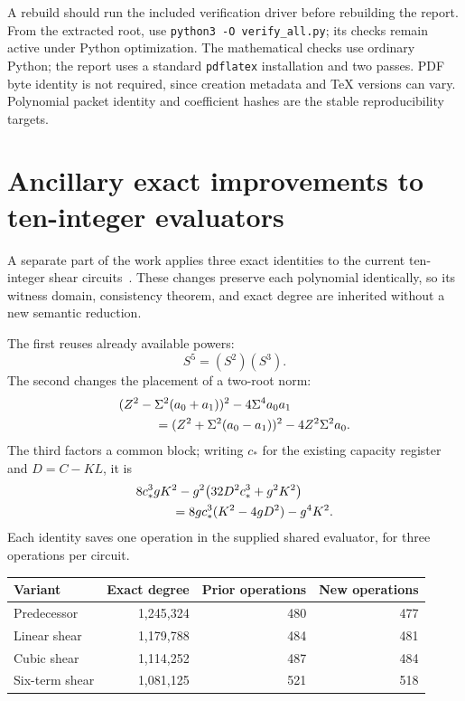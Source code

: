 \documentclass[11pt]{article}
\theoremstyle{definition}
\theoremstyle{remark}
\begin{document}
A rebuild should run the included verification driver before rebuilding
the report. From the extracted root, use
\texttt{python3 -O verify\_all.py}; its checks remain active under Python
optimization. The mathematical checks use ordinary Python; the report uses
a standard \texttt{pdflatex} installation and two passes. PDF byte identity
is not required, since creation metadata and TeX versions can vary.
Polynomial packet identity and coefficient hashes are the stable
reproducibility targets.

\section{Ancillary exact improvements to ten-integer evaluators}
\label{sec:ten}

A separate part of the work applies three exact identities to the
current ten-integer shear circuits~\cite{shears,p68}. These changes preserve
each polynomial identically, so its witness domain, consistency theorem,
and exact degree are inherited without a new semantic reduction.

The first reuses already available powers:
\[
 S^5=(S^2)(S^3).
\]
The second changes the placement of a two-root norm:
\begin{align*}
 &(Z^2-\Sigma^2(a_0+a_1))^2-4\Sigma^4a_0a_1\\
 &\hspace{10mm}=(Z^2+\Sigma^2(a_0-a_1))^2
                         -4Z^2\Sigma^2a_0.
\end{align*}
The third factors a common block; writing \(c_*\) for the existing
capacity register and \(D=C-KL\), it is
\begin{align*}
 &8c_*^3gK^2-g^2\bigl(32D^2c_*^3+g^2K^2\bigr)\\
 &\hspace{10mm}=8gc_*^3(K^2-4gD^2)-g^4K^2.
\end{align*}
Each identity saves one operation in the supplied shared evaluator,
for three operations per circuit.

\begin{center}
\begin{tabular}{@{}lrrr@{}}
\toprule
Variant & Exact degree & Prior operations & New operations\\
\midrule
Predecessor & 1,245,324 & 480 & 477\\
Linear shear & 1,179,788 & 484 & 481\\
Cubic shear & 1,114,252 & 487 & 484\\
Six-term shear & 1,081,125 & 521 & 518\\
\bottomrule
\end{tabular}
\end{center}
\end{document}
